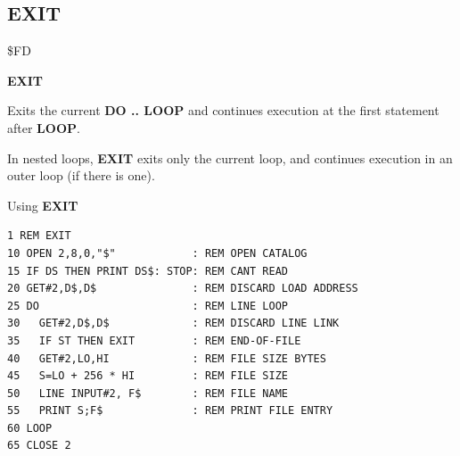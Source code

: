 
\newpage
\subsection{EXIT}
\begin{description}[leftmargin=2cm,style=nextline]
\item [Token:] \$FD
\item [Format:] {\bf EXIT}
\item [Usage:] Exits the current {\bf DO .. LOOP}
               and continues execution at the first
               statement after {\bf LOOP}.

\item [Remarks:] In nested loops, {\bf EXIT} exits only the current loop,
               and continues execution in an outer loop (if there is one).
\item [Example:] Using {\bf EXIT}
\begin{tcolorbox}[colback=black,coltext=white]
\verbatimfont{\codefont}
\begin{verbatim}
1 REM EXIT
10 OPEN 2,8,0,"$"            : REM OPEN CATALOG
15 IF DS THEN PRINT DS$: STOP: REM CANT READ
20 GET#2,D$,D$               : REM DISCARD LOAD ADDRESS
25 DO                        : REM LINE LOOP
30   GET#2,D$,D$             : REM DISCARD LINE LINK
35   IF ST THEN EXIT         : REM END-OF-FILE
40   GET#2,LO,HI             : REM FILE SIZE BYTES
45   S=LO + 256 * HI         : REM FILE SIZE
50   LINE INPUT#2, F$        : REM FILE NAME
55   PRINT S;F$              : REM PRINT FILE ENTRY
60 LOOP
65 CLOSE 2
\end{verbatim}
\end{tcolorbox}
\end{description}


\newpage
